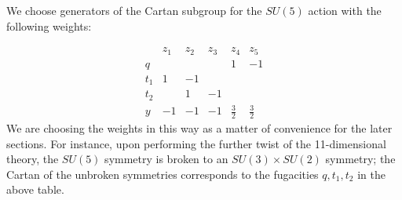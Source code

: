 We choose generators of the Cartan subgroup for the $SU(5)$ action with the following weights:

\[\begin{array}{|c|c|c|c|c|c|}
& z_1 & z_2 & z_3 & z_4 & z_5 \\
\hline
q & & & & 1 & -1 \\
t_1 & 1 & -1 & & & \\
t_2 & & 1 & -1 & & \\
y & -1 & -1 & -1 &\frac 3 2 & \frac 3 2
\end{array}\]
We are choosing the weights in this way as a matter of convenience for the later sections. 
For instance, upon performing the further twist of the 11-dimensional theory, the $SU(5)$ symmetry is broken to an $SU(3)\times SU(2)$ symmetry; the Cartan of the unbroken symmetries corresponds to the fugacities $q, t_1, t_2$ in the above table. 

